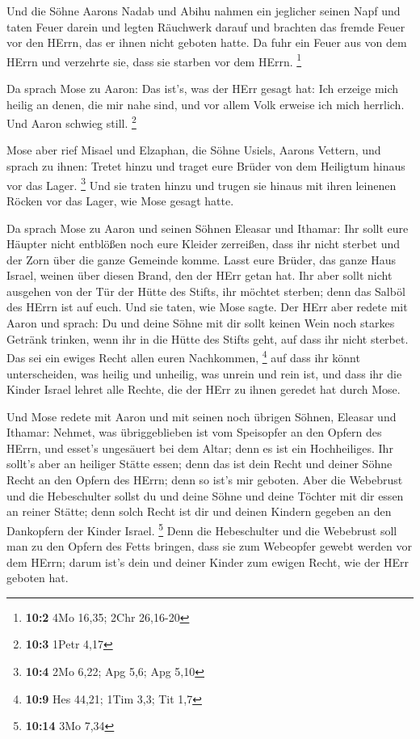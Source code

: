  Und die Söhne Aarons Nadab und Abihu nahmen ein jeglicher
seinen Napf und taten Feuer darein und legten Räuchwerk darauf und
brachten das fremde Feuer vor den HErrn, das er ihnen nicht geboten
hatte.  Da fuhr ein Feuer aus von dem HErrn und verzehrte
sie, dass sie starben vor dem HErrn. \footnote{\textbf{10:2} 4Mo 16,35;
  2Chr 26,16-20}

 Da sprach Mose zu Aaron: Das ist's, was der HErr gesagt
hat: Ich erzeige mich heilig an denen, die mir nahe sind, und vor allem
Volk erweise ich mich herrlich. Und Aaron schwieg still. \footnote{\textbf{10:3}
  1Petr 4,17}

 Mose aber rief Misael und Elzaphan, die Söhne Usiels,
Aarons Vettern, und sprach zu ihnen: Tretet hinzu und traget eure Brüder
von dem Heiligtum hinaus vor das Lager. \footnote{\textbf{10:4} 2Mo
  6,22; Apg 5,6; Apg 5,10}  Und sie traten hinzu und trugen
sie hinaus mit ihren leinenen Röcken vor das Lager, wie Mose gesagt
hatte.

 Da sprach Mose zu Aaron und seinen Söhnen Eleasar und
Ithamar: Ihr sollt eure Häupter nicht entblößen noch eure Kleider
zerreißen, dass ihr nicht sterbet und der Zorn über die ganze Gemeinde
komme. Lasst eure Brüder, das ganze Haus Israel, weinen über diesen
Brand, den der HErr getan hat.  Ihr aber sollt nicht
ausgehen von der Tür der Hütte des Stifts, ihr möchtet sterben; denn das
Salböl des HErrn ist auf euch. Und sie taten, wie Mose sagte.
 Der HErr aber redete mit Aaron und sprach:  Du
und deine Söhne mit dir sollt keinen Wein noch starkes Getränk trinken,
wenn ihr in die Hütte des Stifts geht, auf dass ihr nicht sterbet. Das
sei ein ewiges Recht allen euren Nachkommen, \footnote{\textbf{10:9} Hes
  44,21; 1Tim 3,3; Tit 1,7}  auf dass ihr könnt
unterscheiden, was heilig und unheilig, was unrein und rein ist,
 und dass ihr die Kinder Israel lehret alle Rechte, die der
HErr zu ihnen geredet hat durch Mose.

 Und Mose redete mit Aaron und mit seinen noch übrigen
Söhnen, Eleasar und Ithamar: Nehmet, was übriggeblieben ist vom
Speisopfer an den Opfern des HErrn, und esset's ungesäuert bei dem
Altar; denn es ist ein Hochheiliges.  Ihr sollt's aber an
heiliger Stätte essen; denn das ist dein Recht und deiner Söhne Recht an
den Opfern des HErrn; denn so ist's mir geboten.  Aber die
Webebrust und die Hebeschulter sollst du und deine Söhne und deine
Töchter mit dir essen an reiner Stätte; denn solch Recht ist dir und
deinen Kindern gegeben an den Dankopfern der Kinder Israel. \footnote{\textbf{10:14}
  3Mo 7,34}  Denn die Hebeschulter und die Webebrust soll
man zu den Opfern des Fetts bringen, dass sie zum Webeopfer gewebt
werden vor dem HErrn; darum ist's dein und deiner Kinder zum ewigen
Recht, wie der HErr geboten hat.

